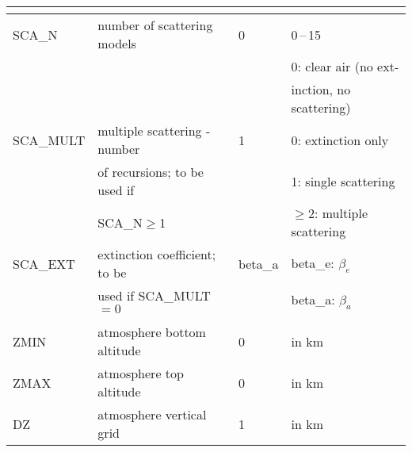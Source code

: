 \begin{table*}[!p]
{\begin{tabular}{|l|l|l|l|}
\multicolumn{4}{|l|}{\cellcolor[RGB]{255,204,230}{Aerosol and Clouds}} \\
\hline
SCA\_N       & number of scattering models   & 0     & 0\,--\,15 \\
             &                               &       & 0: clear air (no ext- \\
             &                               &       & inction, no scattering) \\
SCA\_MULT    & multiple scattering - number  & 1     & 0: extinction only\\
             & of recursions; to be used if  &       & 1: single scattering \\
             & SCA\_N$\ge$1                  &       & $\ge$2: multiple scattering \\
SCA\_EXT     & extinction coefficient; to be &beta\_a& beta\_e: $\beta_e$  \\
             & used if SCA\_MULT$=0$         &       & beta\_a: $\beta_a$  \\
\hline
\hline

\multicolumn{4}{|l|}{\cellcolor[RGB]{255,204,230}{Atmosphere/Climatology}} \\
\hline
ZMIN           & atmosphere bottom altitude  & 0  & in km \\ 
ZMAX           & atmosphere top altitude     & 0  & in km \\
DZ             & atmosphere vertical grid     & 1  & in km \\
\hline
\end{tabular}}
\label{tab:Control1}
\end{table*} 

